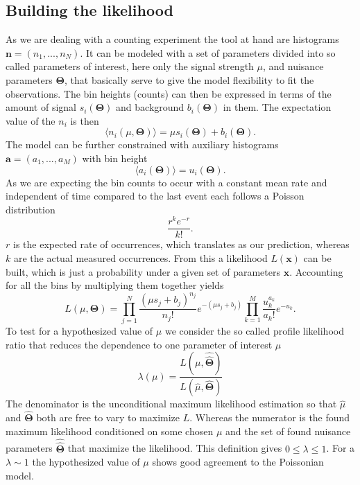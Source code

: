 \subsection{Building the likelihood}
As we are dealing with a counting experiment the tool at hand are histograms $\bm{n}=(n_1,...,n_N)$. It can be modeled with a set of parameters divided into so called parameters of interest, here only the signal strength $\mu$, and nuisance parameters $\bm{\Theta}$, that basically serve to give the model flexibility to fit the observations. The bin heights (counts) can then be expressed in terms of the amount of signal $s_i(\bm{\Theta})$ and background $b_i(\bm{\Theta})$ in them. The expectation value of the $n_i$ is then
\begin{equation} \label{eq:n_i}
    \langle n_i(\mu,\bm{\Theta})\rangle = \mu s_i(\bm{\Theta}) +b_i(\bm{\Theta}).
\end{equation}
The model can be further constrained with auxiliary histograms $\bm{a}=(a_1,...,a_M)$ with bin height
\begin{equation} \label{eq:a_i}
    \langle a_i(\bm{\Theta}) \rangle = u_i(\bm{\Theta}).
\end{equation}
As we are expecting the bin counts to occur with a constant mean rate and independent of time compared to the last event each follows a Poisson distribution
\begin{equation}\label{eq:poisson}
    \frac{r^k e^{-r}}{k!}.
\end{equation}
$r$ is the expected rate of occurrences, which translates as our prediction, whereas $k$ are the actual measured occurrences. From this a likelihood $L(\bm{x})$ can be built, which is just a probability under a given set of parameters $\bm{x}$. Accounting for all the bins by multiplying them together yields
\begin{equation}
    L(\mu,\bm{\Theta})=
    \prod_{j=1}^N \frac{(\mu s_j + b_j)^{n_j}}{n_j !} e^{-(\mu s_j + b_j)}
    \prod_{k=1}^M \frac{u_k^{a_k}}{a_k!} e^{-u_k}.
\end{equation}
To test for a hypothesized value of $\mu$ we consider the so called profile likelihood ratio that reduces the dependence to one parameter of interest $\mu$
\begin{equation}
\lambda(\mu)=
    \frac{L(\mu,\hat{\hat{\bm{\Theta}}})}
    {L(\hat{\mu},\hat{\bm{\Theta}})}
\end{equation}
The denominator is the unconditional maximum likelihood estimation so that $\hat{\mu}$ and $\hat{\bm{\Theta}}$ both are free to vary to maximize $L$. Whereas the numerator is the found maximum likelihood conditioned on some chosen $\mu$ and the set of found nuisance parameters $\hat{\hat{\bm{\Theta}}}$ that maximize the likelihood. This definition gives $0 \leq \lambda \leq 1$. For a $\lambda \sim 1$ the hypothesized value of $\mu$ shows good agreement to the Poissonian model.


